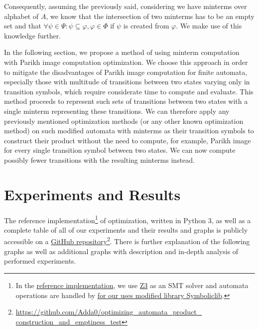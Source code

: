 Consequently, assuming the previously said, considering we have minterms over alphabet of $A$, we know that the intersection of two minterms has to be an empty set and that $\forall \psi \in \Psi: \psi \subseteq \varphi, \varphi \in \Phi$ if $\psi$ is created from $\varphi$. We make use of this knowledge further.

In the following section, we propose a method of using minterm computation with Parikh image computation optimization. We choose this approach in order to mitigate the disadvantages of Parikh image computation for finite automata, especially those with multitude of transitions between two states varying only in transition symbols, which require considerate time to compute and evaluate. This method proceeds to represent such sets of transitions between two states with a single minterm representing these transitions. We can therefore apply any previously mentioned optimization methods (or any other known optimization method) on such modified automata with minterms as their transition symbols to construct their product without the need to compute, for example, Parikh image for every single transition symbol between two states. We can now compute possibly fewer transitions with the resulting minterms instead.




\chapter{Experiments and Results}\label{experimentsAndResultsChapter}

The reference implementation\footnote{In the \href{https://github.com/Adda0/optimizing_automata_product_construction_and_emptiness_test}{reference implementation}, we use \href{https://github.com/Z3Prover/z3}{Z3} as an SMT solver and automata operations are handled by \href{https://github.com/Adda0/symboliclib}{for our uses modified library Symboliclib}.} of optimization, written in Python 3, as well as a complete table of all of our experiments and their results and graphs is publicly accessible on a \href{https://github.com/Adda0/optimizing_automata_product_construction_and_emptiness_test}{GitHub repository}\footnote{{\href{https://github.com/Adda0/optimizing_automata_product_construction_and_emptiness_test}{https://github.com/Adda0/optimizing\_automata\_product\_\\construction\_and\_emptiness\_test}}}. There is further explanation of the following graphs as well as additional graphs with description and in-depth analysis of performed experiments.

